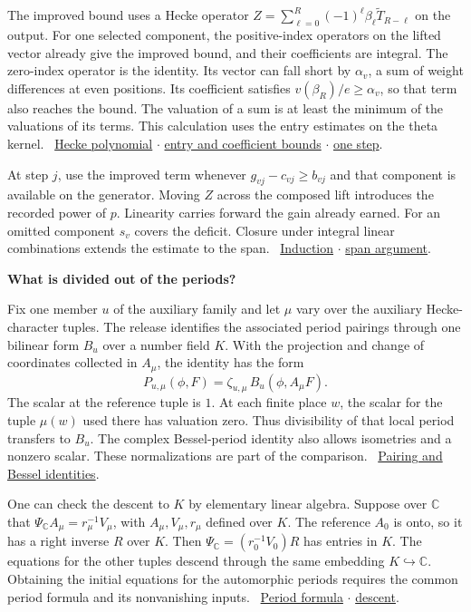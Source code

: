 \documentclass[11pt,letterpaper]{article}
\newcommand{\heading}[1]{{\sffamily\bfseries\fontsize{22}{25}\selectfont #1\par}\vspace{2pt}}
\newcommand{\links}[1]{\unskip\ {\small\sffamily\color{muted}#1}}
\newcommand{\repo}{https://github.com/TomasOrtega/RH/blob/a6ac91a412dcbaab31801355ec5707024a71bf65/extracted/lean/src/}
\newcommand{\src}[3]{\href{\repo#1.lean\#L#2}{#3}}
\newcommand{\growth}{Formalism/SharpRestriction/GrowthBounds/}
\newcommand{\multi}{Formalism/SharpRestriction/GrowthBounds/MultisetValuation/}
\newcommand{\third}{Development/AutomorphicArithmetic/ThetaCorrespondence/ThetaPairLifts/ThirdPlaceSeries/}
\newcommand{\CC}{\mathbb C}
\begin{document}
The improved bound uses a Hecke operator \(Z=\sum_{\ell=0}^R(-1)^\ell\beta_\ell\widetilde T_{R-\ell}\) on the output. For one selected component, the positive-index operators on the lifted vector already give the improved bound, and their coefficients are integral. The zero-index operator is the identity. Its vector can fall short by \(\alpha_v\), a sum of weight differences at even positions. Its coefficient satisfies \(v(\beta_R)/e\ge\alpha_v\), so that term also reaches the bound. The valuation of a sum is at least the minimum of the valuations of its terms. This calculation uses the entry estimates on the theta kernel. \links{\src{\growth FormalGroupSystem}{352}{Hecke polynomial} $\cdot$ \src{\growth FormalGroupSystem}{661}{entry and coefficient bounds} $\cdot$ \src{\multi AofUpdate}{172}{one step}.}

At step \(j\), use the improved term whenever \(g_{vj}-c_{vj}\ge b_{vj}\) and that component is available on the generator. Moving \(Z\) across the composed lift introduces the recorded power of \(p\). Linearity carries forward the gain already earned. For an omitted component \(s_v\) covers the deficit. Closure under integral linear combinations extends the estimate to the span. \links{\src{\multi YEPEComm}{131}{Induction} $\cdot$ \src{\multi LiftBoundOfIntegrality}{103}{span argument}.}

\newpage
{}
\heading{What is divided out of the periods?}
Fix one member \(u\) of the auxiliary family and let \(\mu\) vary over the auxiliary Hecke-character tuples. The release identifies the associated period pairings through one bilinear form \(B_u\) over a number field \(K\). With the projection and change of coordinates collected in \(A_\mu\), the identity has the form
\[
               P_{u,\mu}(\phi,F)=\zeta_{u,\mu}\, B_u(\phi,A_\mu F).
\]
The scalar at the reference tuple is \(1\). At each finite place \(w\), the scalar for the tuple \(\mu(w)\) used there has valuation zero. Thus divisibility of that local period transfers to \(B_u\). The complex Bessel-period identity also allows isometries and a nonzero scalar. These normalizations are part of the comparison. \links{\src{Formalism/LocalToGlobal/IndefiniteForms/IndefSide}{383}{Pairing and Bessel identities}.}

One can check the descent to \(K\) by elementary linear algebra. Suppose over \(\CC\) that \(\Psi_{\CC} A_\mu=r_\mu^{-1}V_\mu\), with \(A_\mu,V_\mu,r_\mu\) defined over \(K\). The reference \(A_0\) is onto, so it has a right inverse \(R\) over \(K\). Then \(\Psi_{\CC}=(r_0^{-1}V_0)R\) has entries in \(K\). The equations for the other tuples descend through the same embedding \(K\hookrightarrow\CC\). Obtaining the initial equations for the automorphic periods requires the common period formula and its nonvanishing inputs. \links{\src{\third OneMapOfRows}{39}{Period formula} $\cdot$ \src{Development/AbelianVarietyTheory/Proofs/DivisorProofs/ComplexMatrixDescendsOfRationalOnTuple}{5}{descent}.}
\end{document}
